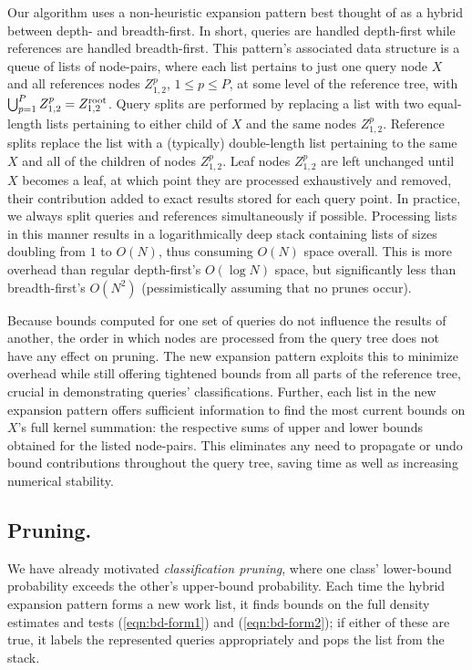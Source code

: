 \documentclass[twoside,leqno,twocolumn]{article}
\newcommand{\kdroot}[1]{#1^{\rm root}}
\begin{document}
Our algorithm uses a non-heuristic expansion pattern best thought of
as a hybrid between depth- and breadth-first.  In short, queries are
handled depth-first while references are handled breadth-first.  This
pattern's associated data structure is a queue of lists of node-pairs,
where each list pertains to just one query node $X$ and all references
nodes $Z_{1,2}^p$, $1 \leq p \leq P$, at some level of the reference
tree, with $\bigcup_{p=1}^P Z_{1,2}^p = \kdroot{Z_{1,2}}$.  Query
splits are performed by replacing a list with two equal-length lists
pertaining to either child of $X$ and the same nodes $Z_{1,2}^p$.
Reference splits replace the list with a (typically) double-length
list pertaining to the same $X$ and all of the children of nodes
$Z_{1,2}^p$.  Leaf nodes $Z_{1,2}^p$ are left unchanged until $X$
becomes a leaf, at which point they are processed exhaustively and
removed, their contribution added to exact results stored for each
query point.  In practice, we always split queries and references
simultaneously if possible.  Processing lists in this manner results
in a logarithmically deep stack containing lists of sizes doubling
from $1$ to $O(N)$, thus consuming $O(N)$ space overall.  This is more
overhead than regular depth-first's $O(\log N)$ space, but
significantly less than breadth-first's $O(N^2)$ (pessimistically
assuming that no prunes occur).

Because bounds computed for one set of queries do not influence the
results of another, the order in which nodes are processed from the
query tree does not have any effect on pruning.  The new expansion
pattern exploits this to minimize overhead while still offering
tightened bounds from all parts of the reference tree, crucial in
demonstrating queries' classifications.  Further, each list in the new
expansion pattern offers sufficient information to find the most
current bounds on $X$'s full kernel summation: the respective sums of
upper and lower bounds obtained for the listed node-pairs.  This
eliminates any need to propagate or undo bound contributions
throughout the query tree, saving time as well as increasing numerical
stability.

\subsection{Pruning.}
We have already motivated {\em classification pruning}, where one
class' lower-bound probability exceeds the other's upper-bound
probability.  Each time the hybrid expansion pattern forms a new work
list, it finds bounds on the full density estimates and tests
(\ref{eqn:bd-form1}) and (\ref{eqn:bd-form2}); if either of these are
true, it labels the represented queries appropriately and pops the
list from the stack.
\end{document}
